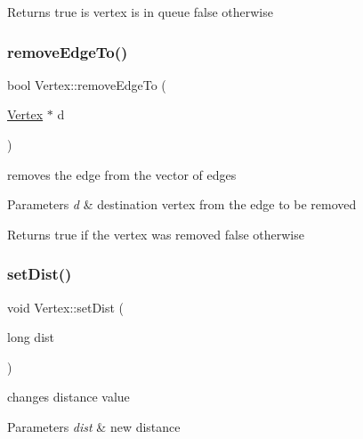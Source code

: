 \begin{DoxyReturn}{Returns}
true is vertex is in queue false otherwise 
\end{DoxyReturn}
\hypertarget{class_vertex_a0fb9defc6bc64bd16e51bcf867c511cf}{}\label{class_vertex_a0fb9defc6bc64bd16e51bcf867c511cf} 
\subsubsection{\texorpdfstring{remove\+Edge\+To()}{removeEdgeTo()}}
{\footnotesize\ttfamily bool Vertex\+::remove\+Edge\+To (\begin{DoxyParamCaption}\item[{\hyperlink{class_vertex}{Vertex} $\ast$}]{d }\end{DoxyParamCaption})}



removes the edge from the vector of edges 


\begin{DoxyParams}{Parameters}
{\em d} & destination vertex from the edge to be removed\\
\hline
\end{DoxyParams}
\begin{DoxyReturn}{Returns}
true if the vertex was removed false otherwise 
\end{DoxyReturn}
\hypertarget{class_vertex_a5c2c39cab1350900bbeb42cfa99b70d2}{}\label{class_vertex_a5c2c39cab1350900bbeb42cfa99b70d2} 
\subsubsection{\texorpdfstring{set\+Dist()}{setDist()}}
{\footnotesize\ttfamily void Vertex\+::set\+Dist (\begin{DoxyParamCaption}\item[{long}]{dist }\end{DoxyParamCaption})}



changes distance value 


\begin{DoxyParams}{Parameters}
{\em dist} & new distance \\
\hline
\end{DoxyParams}
\hypertarget{class_vertex_ab64d264d0cee87b14859d2a9df071403}{}\label{class_vertex_ab64d264d0cee87b14859d2a9df071403} 
